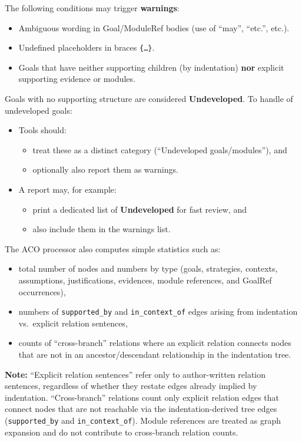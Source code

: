 \documentclass[11pt,twoside,a4paper]{article}
\begin{document}
The following conditions may trigger \textbf{warnings}:

\begin{itemize}[leftmargin=2em]
  \item Ambiguous wording in Goal/ModuleRef bodies (use of ``may'', ``etc.'', etc.).
  \item Undefined placeholders in braces \texttt{\{\dots\}}.
  \item Goals that have neither supporting children (by indentation) \textbf{nor} explicit supporting evidence or modules.
\end{itemize}

Goals with no supporting structure are considered \textbf{Undeveloped}.
To handle of undeveloped goals:

\begin{itemize}[leftmargin=2em]
  \item Tools should:
  \begin{itemize}[leftmargin=1.5em]
    \item treat these as a distinct category (``Undeveloped goals/modules''), and
    \item optionally also report them as warnings.
  \end{itemize}
  \item A report may, for example:
  \begin{itemize}[leftmargin=1.5em]
    \item print a dedicated list of \textbf{Undeveloped} for fast review, and
    \item also include them in the warnings list.
  \end{itemize}
\end{itemize}

The ACO processor also computes simple statistics such as:
\begin{itemize}[leftmargin=2em]
  \item total number of nodes and numbers by type (goals, strategies, contexts, assumptions, justifications, evidences, module references, and GoalRef occurrences),
  \item numbers of \texttt{supported\_by} and \texttt{in\_context\_of} edges arising from indentation vs.\ explicit relation sentences,
  \item counts of ``cross-branch'' relations where an explicit relation connects nodes that are not in an ancestor/descendant relationship in the indentation tree.
\end{itemize}
%
\noindent\textbf{Note:} ``Explicit relation sentences'' refer only to author-written relation sentences, regardless of whether they restate edges already implied by indentation.
``Cross-branch'' relations count only explicit relation edges that connect nodes that are not reachable via the indentation-derived tree edges (\texttt{supported\_by} and \texttt{in\_context\_of}).
Module references are treated as graph expansion and do not contribute to cross-branch relation counts.
\end{document}
